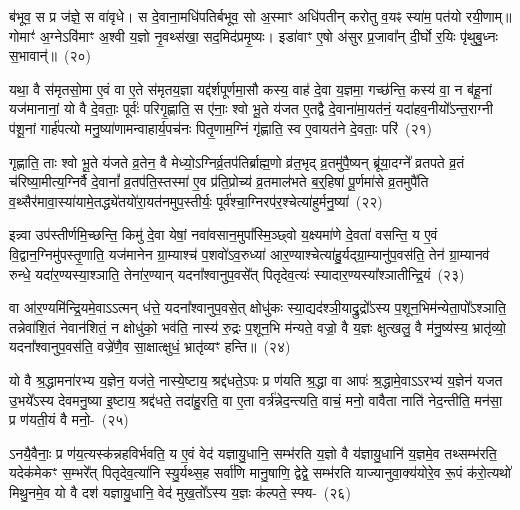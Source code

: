 ब॑भूव॒ स प्र ज॑ज्ञे॒ स वा॑वृधे। स दे॒वाना॒मधि॑पतिर्बभूव॒ सो अ॒स्माꣳ अधि॑पतीन् करोतु व॒यꣴ स्या॑म॒ पत॑यो रयी॒णाम्॥ गोमाꣳ॑ अ॒ग्ने\-ऽवि॑माꣳ अ॒श्वी य॒ज्ञो नृ॒वथ्स॑खा॒ सद॒मिद॑प्रमृ॒ष्यः। इडा॑वाꣳ ए॒षो अ॑सुर प्र॒जावा᳚न् दी॒र्घो र॒यिः पृ॑थुबु॒ध्नः स॒भावान्॑॥~(२०)

{\anuvakamend[{द्वि॒ष्मः सु॒वीर्य॒ꣳ॒ स आ पञ्च॑त्रिꣳशच्च}]}%

यथा॒ वै स॑मृतसो॒मा ए॒वं वा ए॒ते स॑मृतय॒ज्ञा यद्द॑र्\mbox{}श\-पूर्ण\-मा॒सौ कस्य॒ वाह॑ दे॒वा य॒ज्ञमा॒ गच्छ॑न्ति॒ कस्य॑ वा॒ न ब॑हू॒नां यज॑मानानां॒ यो वै दे॒वताः॒ पूर्वः॑ परिगृ॒ह्णाति॒ स ए॑नाः॒ श्वो भू॒ते य॑जत ए॒तद्वै दे॒वाना॑मा॒यत॑नं॒ यदा॑हव॒नीयो᳚\-ऽन्त॒राग्नी प॑शू॒नां गार्\mbox{}ह॑पत्यो मनु॒ष्या॑णामन्वाहार्य॒पच॑नः पितृ॒णाम॒ग्निं गृ॑ह्णाति॒ स्व ए॒वायत॑ने दे॒वताः॒ परि॑~(२१)

गृह्णाति॒ ताः श्वो भू॒ते य॑जते व्र॒तेन॒ वै मेध्यो॒\-ऽग्निर्व्र॒तप॑तिर्ब्राह्म॒णो व्र॑त॒भृद् व्र॒तमु॑पै॒ष्यन् ब्रू॑या॒दग्ने᳚ व्रतपते व्र॒तं च॑रिष्या॒मीत्य॒ग्निर्वै दे॒वानां᳚ व्र॒तप॑ति॒स्तस्मा॑ ए॒व प्र॑ति॒प्रोच्य॑ व्र॒तमाल॑भते ब॒र्॒\mbox{}हिषा॑ पू॒र्णमा॑से व्र॒तमुपै॑ति व॒थ्सैर॑मा\-वा॒स्या॑यामे॒तद्ध्ये॑तयो॑\-रा॒यत॑न\-मुप॒स्तीर्यः॒ पूर्व॑श्चा॒ग्निरप॑र॒\-श्चेत्या॑हुर्मनु॒ष्या॑~(२२)

इन्न्वा उप॑स्तीर्णमि॒च्छन्ति॒ किमु॑ दे॒वा येषां॒ नवा॑वसान॒\-मुपा᳚स्मि॒ञ्छ्वो य॒क्ष्यमा॑णे दे॒वता॑ वसन्ति॒ य ए॒वं वि॒द्वान॒ग्निमु॑पस्तृ॒णाति॒ यज॑मानेन ग्रा॒म्याश्च॑ प॒शवो॑\-ऽव॒रुध्या॑ आर॒ण्याश्चेत्या॑\-हु॒र्यद्ग्रा॒म्यानु॑प॒\-वस॑ति॒ तेन॑ ग्रा॒म्यानव॑ रुन्धे॒ यदा॑र॒ण्यस्या॒श्ञाति॒ तेना॑र॒ण्यान् यदना᳚श्वानुप॒वसे᳚त् पितृदेव॒त्यः॑ स्यादा\-र॒ण्यस्या᳚श्ञातीन्द्रि॒यं~(२३)

वा आ॑र॒ण्यमि॑न्द्रि॒यमे॒वा\-ऽ\-ऽत्मन् ध॑त्ते॒ यदना᳚श्वानुप॒वसे॒त् क्षोधु॑कः स्या॒द्यद॑श्ञी॒याद्रु॒द्रो᳚\-ऽस्य प॒शून॒भिम॑न्येता॒पो᳚\-ऽश्ञाति॒ तन्नेवा॑शि॒तं नेवान॑शितं॒ न क्षोधु॑को॒ भव॑ति॒ नास्य॑ रु॒द्रः प॒शून॒भि म॑न्यते॒ वज्रो॒ वै य॒ज्ञः क्षुत्खलु॒ वै म॑नु॒ष्य॑स्य॒ भ्रातृ॑व्यो॒ यदना᳚श्वानुप॒वस॑ति॒ वज्रे॑णै॒व सा॒क्षात्क्षुधं॒ भ्रातृ॑व्यꣳ हन्ति॥~(२४)

{\anuvakamend[{परि॑ मनु॒ष्या॑ इन्द्रि॒यꣳ सा॒क्षात् त्रीणि॑ च}]}%

यो वै श्र॒द्धामना॑रभ्य य॒ज्ञेन॒ यज॑ते॒ नास्ये॒ष्टाय॒ श्रद्द॑धते॒\-ऽपः प्र ण॑यति श्र॒द्धा वा आपः॑ श्र॒द्धामे॒वा\-ऽ\-ऽरभ्य॑ य॒ज्ञेन॑ यजत उ॒भये᳚\-ऽस्य देवमनु॒ष्या इ॒ष्टाय॒ श्रद्द॑धते॒ तदा॑हु॒रति॒ वा ए॒ता वर्त्र॑न्नेद॒न्त्यति॒ वाचं॒ मनो॒ वावैता नाति॑ नेद॒न्तीति॒ मन॑सा॒ प्र ण॑यती॒यं वै मनो॒-~(२५)

ऽनयै॒वैनाः॒ प्र ण॑य॒त्यस्क॑न्नहविर्भवति॒ य ए॒वं वेद॑ यज्ञायु॒धानि॒ सम्भ॑रति य॒ज्ञो वै य॑ज्ञायु॒धानि॑ य॒ज्ञमे॒व तथ्सम्भ॑रति॒ यदेक॑मेकꣳ स॒म्भरे᳚त् पितृदेव॒त्या॑नि स्यु॒र्यथ्स॒ह सर्वा॑णि मानु॒षाणि॒ द्वेद्वे॒ सम्भ॑रति याज्यानुवा॒क्य॑योरे॒व रू॒पं क॑रो॒त्यथो॑ मिथु॒नमे॒व यो वै दश॑ यज्ञायु॒धानि॒ वेद॑ मुख॒तो᳚\-ऽस्य य॒ज्ञः क॑ल्पते॒ स्फ्य-~(२६)

